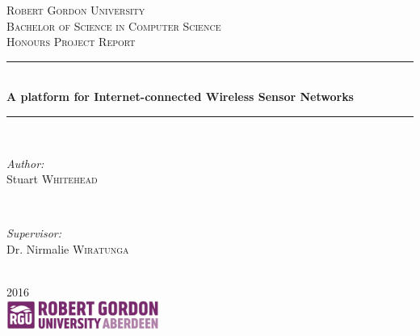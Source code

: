 \begin{titlepage}
  \newcommand{\HRule}{\rule{\linewidth}{0.5mm}}
  \center

  \textsc{\LARGE Robert Gordon University}\\[1.5cm]
  \textsc{\Large Bachelor of Science in Computer Science}\\[0.5cm]
  \textsc{\large Honours Project Report}\\[0.5cm]

  \HRule \\[0.4cm]
  { \huge \bfseries A platform for Internet-connected Wireless Sensor Networks}\\[0.4cm]
  \HRule \\[1.5cm]

  \begin{minipage}{0.4\textwidth}
  \begin{flushleft} \large
  \emph{Author:}\\
  Stuart \textsc{Whitehead}
  \end{flushleft}
  \end{minipage}
  ~
  \begin{minipage}{0.4\textwidth}
  \begin{flushright} \large
  \emph{Supervisor:} \\
  Dr. Nirmalie \textsc{Wiratunga}
  \end{flushright}
  \end{minipage}\\[4cm]

  {\large 2016}\\[3cm]

  \includegraphics[width=5cm, scale=0.1]{assets/rgu-logo.png}\\[1cm]
  \vfill
\end{titlepage}
